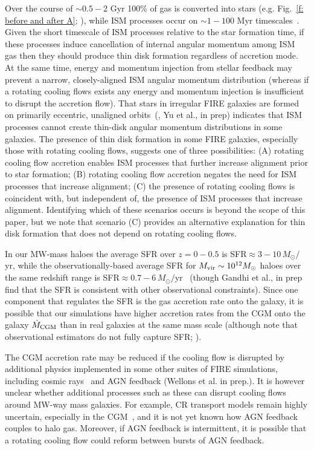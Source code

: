 \documentclass[fleqn,usenatbib]{mnras}
\newcommand{\Mdot}{\dot{M}}
\begin{document}
Over the course of ${\sim} 0.5-2$ Gyr 100\% of gas is converted into stars (e.g. Fig.~\ref{f: before and after A}; \citealt{Bigiel2008}), while ISM processes occur on ${\sim} 1-100$ Myr timescales~\citep[e.g.][]{Semenov2017, Kruijssen2019b}.
Given the short timescale of ISM processes relative to the star formation time, if these processes induce cancellation of internal angular momentum among ISM gas then they should produce thin disk formation regardless of accretion mode.
At the same time, energy and momentum injection from stellar feedback may prevent a narrow, closely-aligned ISM angular momentum distribution (whereas if a rotating cooling flows exists any energy and momentum injection is insufficient to disrupt the accretion flow).
That stars in irregular FIRE galaxies are formed on primarily eccentric, unaligned orbits~(\citealt{Yu2021}, Yu et al., in prep) indicates that ISM processes cannot create thin-disk angular momentum distributions in some galaxies.
The presence of thin disk formation in some FIRE galaxies, especially those with rotating cooling flows, suggests one of three possibilities:
(A) rotating cooling flow accretion enables ISM processes that further increase alignment prior to star formation;
(B) rotating cooling flow accretion negates the need for ISM processes that increase alignment;
(C) the presence of rotating cooling flows is coincident with, but independent of, the presence of ISM processes that increase alignment.
Identifying which of these scenarios occurs is beyond the scope of this paper, but we note that scenario (C) provides an alternative explanation for thin disk formation that does not depend on rotating cooling flows.

In our MW-mass haloes the average SFR over $z=0-0.5$ is SFR$\approx 3-10\,M_\odot/$yr, while the observationally-based average SFR for $M_{\rm vir} \sim 10^{12} M_\odot$ haloes over the same redshift range is SFR$\approx 0.7-6\,M_\odot/$yr~\citep{Behroozi2013} (though Gandhi et al., in prep find that the SFR is consistent with other observational constraints).
Since one component that regulates the SFR is the gas accretion rate onto the galaxy, it is possible that our simulations have higher accretion rates from the CGM onto the galaxy $\Mdot_{\rm CGM}$ than in real galaxies at the same mass scale (although note that observational estimators do not fully capture SFR; \citealt{FloresVelazquez2021}).

The CGM accretion rate may be reduced if the cooling flow is disrupted by additional physics implemented in some other suites of FIRE simulations, including cosmic rays~\citep{Chan2019, Hopkins2020a, Hopkins2021e, Hopkins2021d} and AGN feedback (Wellons et al. in prep.).
It is however unclear whether additional processes such as these can disrupt cooling flows around MW-way mass galaxies.
For example, CR transport models remain highly uncertain, especially in the CGM~\citep{Hopkins2021, Quataert2021, Quataert2021a}, and it is not yet known how AGN feedback couples to halo gas.
Moreover, if AGN feedback is intermittent, it is possible that a rotating cooling flow could reform between bursts of AGN feedback.
\end{document}
